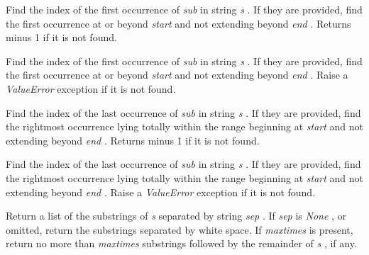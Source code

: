 Find the index of the first
occurrence of \emph{sub} in string \emph{s} . If they are provided, find
the first occurrence at or beyond \emph{start} and not extending beyond
\emph{end} . Returns minus 1 if it is not found.













Find the index of the first
occurrence of \emph{sub} in string \emph{s} . If they are provided, find
the first occurrence at or beyond \emph{start} and not extending beyond
\emph{end} . Raise a \emph{ValueError} exception if it is not found.













Find the index of the last
occurrence of \emph{sub} in string \emph{s} . If they are provided, find
the rightmost occurrence lying totally within the range beginning at
\emph{start} and not extending beyond \emph{end} . Returns minus 1 if it
is not found.













Find the index of the last
occurrence of \emph{sub} in string \emph{s} . If they are provided, find
the rightmost occurrence lying totally within the range beginning at
\emph{start} and not extending beyond \emph{end} . Raise a
\emph{ValueError} exception if it is not found.













Return a list of the substrings of
\emph{s} separated by string \emph{sep} . If \emph{sep} is \emph{None} ,
or omitted, return the substrings separated by white space. If
\emph{maxtimes} is present, return no more than \emph{maxtimes}
substrings followed by the remainder of \emph{s} , if any.







